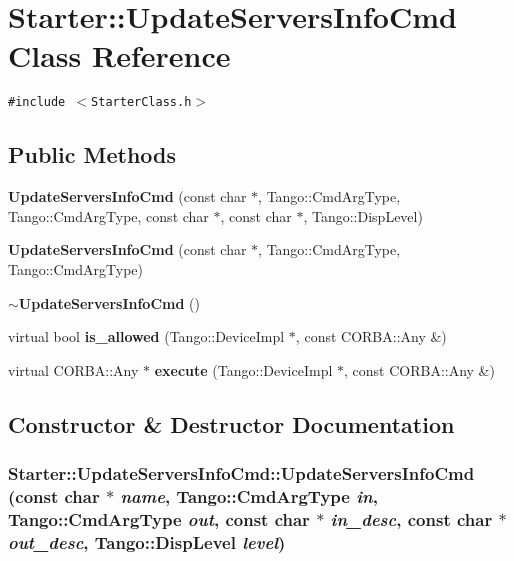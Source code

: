 \section{Starter::Update\-Servers\-Info\-Cmd  Class Reference}
\label{classStarter_1_1UpdateServersInfoCmd}
{\tt \#include $<$Starter\-Class.h$>$}

\subsection*{Public Methods}
\begin{CompactItemize}
\item 
{\bf Update\-Servers\-Info\-Cmd} (const char $\ast$, Tango::Cmd\-Arg\-Type, Tango::Cmd\-Arg\-Type, const char $\ast$, const char $\ast$, Tango::Disp\-Level)
\item 
{\bf Update\-Servers\-Info\-Cmd} (const char $\ast$, Tango::Cmd\-Arg\-Type, Tango::Cmd\-Arg\-Type)
\item 
{\bf $\sim$Update\-Servers\-Info\-Cmd} ()
\item 
virtual bool {\bf is\_\-allowed} (Tango::Device\-Impl $\ast$, const CORBA::Any \&)
\item 
virtual CORBA::Any $\ast$ {\bf execute} (Tango::Device\-Impl $\ast$, const CORBA::Any \&)
\end{CompactItemize}


\subsection{Constructor \& Destructor Documentation}
\subsubsection{\setlength{\rightskip}{0pt plus 5cm}Starter::Update\-Servers\-Info\-Cmd::Update\-Servers\-Info\-Cmd (const char $\ast$ {\em name}, Tango::Cmd\-Arg\-Type {\em in}, Tango::Cmd\-Arg\-Type {\em out}, const char $\ast$ {\em in\_\-desc}, const char $\ast$ {\em out\_\-desc}, Tango::Disp\-Level {\em level})}\label{classStarter_1_1UpdateServersInfoCmd_a0}


